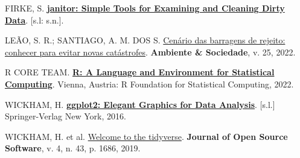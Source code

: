 \documentclass[
  letterpaper,
  DIV=11,
  numbers=noendperiod]{scrartcl}
\newlength{\cslhangindent}
\newlength{\cslentryspacingunit} %
\newenvironment{CSLReferences}[2] %
 {%
  \setlength{\parindent}{0pt}
  \ifodd #1
  \let\oldpar\par
  \def\par{\hangindent=\cslhangindent\oldpar}
  \fi
  \setlength{\parskip}{#2\cslentryspacingunit}
 }%
 {}
\begin{document}
\hypertarget{refs}{}
\begin{CSLReferences}{0}{1}
\leavevmode{}%
FIRKE, S. \textbf{\href{https://github.com/sfirke/janitor}{janitor:
Simple Tools for Examining and Cleaning Dirty Data}}. {[}s.l: s.n.{]}.

\leavevmode{}%
LEÃO, S. R.; SANTIAGO, A. M. DOS S.
\href{https://doi.org/10.1590/1809-4422asoc20210066r1vu2022l2ao}{Cenário
das barragens de rejeito: conhecer para evitar novas catástrofes}.
\textbf{Ambiente \& Sociedade}, v. 25, 2022.

\leavevmode{}%
R CORE TEAM. \textbf{\href{https://www.R-project.org/}{R: A Language and
Environment for Statistical Computing}}. Vienna, Austria: R Foundation
for Statistical Computing, 2022.

\leavevmode{}%
WICKHAM, H. \textbf{\href{https://ggplot2.tidyverse.org}{ggplot2:
Elegant Graphics for Data Analysis}}. {[}s.l.{]} Springer-Verlag New
York, 2016.

\leavevmode{}%
WICKHAM, H. et al. \href{https://doi.org/10.21105/joss.01686}{Welcome to
the {tidyverse}}. \textbf{Journal of Open Source Software}, v. 4, n. 43,
p. 1686, 2019.

\end{CSLReferences}
\end{document}
